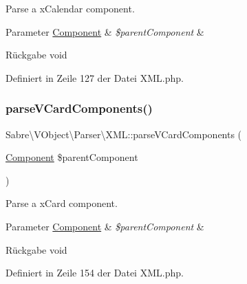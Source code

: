 Parse a x\+Calendar component.


\begin{DoxyParams}[1]{Parameter}
\mbox{\hyperlink{class_sabre_1_1_v_object_1_1_component}{Component}} & {\em \$parent\+Component} & \\
\hline
\end{DoxyParams}
\begin{DoxyReturn}{Rückgabe}
void 
\end{DoxyReturn}


Definiert in Zeile 127 der Datei X\+M\+L.\+php.

\mbox{\label{class_sabre_1_1_v_object_1_1_parser_1_1_x_m_l_a880ce5881f9b9bc421a79d4d7a541be3}} 
\subsubsection{\texorpdfstring{parse\+V\+Card\+Components()}{parseVCardComponents()}}
{\footnotesize\ttfamily Sabre\textbackslash{}\+V\+Object\textbackslash{}\+Parser\textbackslash{}\+X\+M\+L\+::parse\+V\+Card\+Components (\begin{DoxyParamCaption}\item[{\mbox{\hyperlink{class_sabre_1_1_v_object_1_1_component}{Component}}}]{\$parent\+Component }\end{DoxyParamCaption})\hspace{0.3cm}{\ttfamily [protected]}}

Parse a x\+Card component.


\begin{DoxyParams}[1]{Parameter}
\mbox{\hyperlink{class_sabre_1_1_v_object_1_1_component}{Component}} & {\em \$parent\+Component} & \\
\hline
\end{DoxyParams}
\begin{DoxyReturn}{Rückgabe}
void 
\end{DoxyReturn}


Definiert in Zeile 154 der Datei X\+M\+L.\+php.

\mbox{\label{class_sabre_1_1_v_object_1_1_parser_1_1_x_m_l_a1a3a2e8b6a10cfc161c03acef9ed712c}} 
